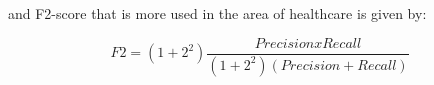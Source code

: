 \documentclass[letterpaper,12pt,openright,oneside]{article}
\begin{document}











and F2-score that is more used in the area of healthcare is given by:

\begin{equation}
F2 = (1+2^2) \frac{Precision x Recall}{(1+2^2)(Precision + Recall)}
\end{equation}







\end{document}
